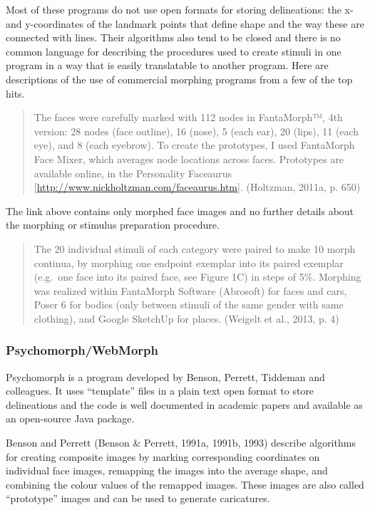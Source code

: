 \documentclass[
  doc,floatsintext]{apa6}
\begin{document}
Most of these programs do not use open formats for storing delineations: the x- and y-coordinates of the landmark points that define shape and the way these are connected with lines. Their algorithms also tend to be closed and there is no common language for describing the procedures used to create stimuli in one program in a way that is easily translatable to another program. Here are descriptions of the use of commercial morphing programs from a few of the top hits.

\begin{quote}
The faces were carefully marked with 112 nodes in FantaMorph™, 4th version: 28 nodes (face outline), 16 (nose), 5 (each ear), 20 (lips), 11 (each eye), and 8 (each eyebrow). To create the prototypes, I used FantaMorph Face Mixer, which averages node locations across faces. Prototypes are available online, in the Personality Faceaurus {[}\url{http://www.nickholtzman.com/faceaurus.htm}{]}. (Holtzman, 2011a, p. 650)
\end{quote}

The link above contains only morphed face images and no further details about the morphing or stimulus preparation procedure.

\begin{quote}
The 20 individual stimuli of each category were paired to make 10 morph continua, by morphing one endpoint exemplar into its paired exemplar (e.g.~one face into its paired face, see Figure 1C) in steps of 5\%. Morphing was realized within FantaMorph Software (Abrosoft) for faces and cars, Poser 6 for bodies (only between stimuli of the same gender with same clothing), and Google SketchUp for places. (Weigelt et al., 2013, p. 4)
\end{quote}

\hypertarget{psychomorph}{%
\subsubsection{Psychomorph/WebMorph}\label{psychomorph}}

Psychomorph is a program developed by Benson, Perrett, Tiddeman and colleagues. It uses ``template'' files in a plain text open format to store delineations and the code is well documented in academic papers and available as an open-source Java package.

Benson and Perrett (Benson \& Perrett, 1991a, 1991b, 1993) describe algorithms for creating composite images by marking corresponding coordinates on individual face images, remapping the images into the average shape, and combining the colour values of the remapped images. These images are also called ``prototype'' images and can be used to generate caricatures.
\end{document}
